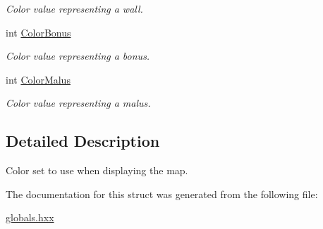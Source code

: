 \begin{DoxyCompactItemize}
\begin{DoxyCompactList}\small\item\em Color value representing a wall. \end{DoxyCompactList}\item 
\hypertarget{struct_chase_game_1_1_s_color_set_aacd34496b36640358ecae127f6bb6cc4}{int \hyperlink{struct_chase_game_1_1_s_color_set_aacd34496b36640358ecae127f6bb6cc4}{Color\-Bonus}}\label{struct_chase_game_1_1_s_color_set_aacd34496b36640358ecae127f6bb6cc4}

\begin{DoxyCompactList}\small\item\em Color value representing a bonus. \end{DoxyCompactList}\item 
\hypertarget{struct_chase_game_1_1_s_color_set_aa2eb52b7d1fb4059da9935a230715498}{int \hyperlink{struct_chase_game_1_1_s_color_set_aa2eb52b7d1fb4059da9935a230715498}{Color\-Malus}}\label{struct_chase_game_1_1_s_color_set_aa2eb52b7d1fb4059da9935a230715498}

\begin{DoxyCompactList}\small\item\em Color value representing a malus. \end{DoxyCompactList}\end{DoxyCompactItemize}


\subsection{Detailed Description}
Color set to use when displaying the map. 

The documentation for this struct was generated from the following file\-:\begin{DoxyCompactItemize}
\item 
\hyperlink{globals_8hxx}{globals.\-hxx}\end{DoxyCompactItemize}
